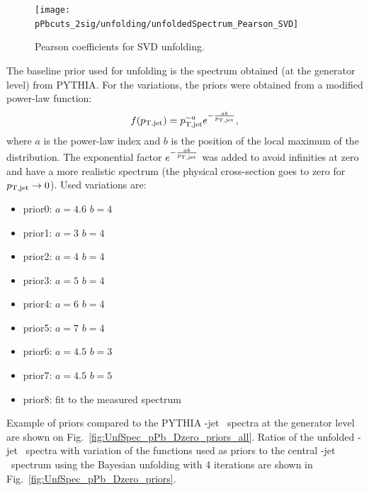 \begin{figure}[bth]
\centering
\texttt{[image: pPbcuts\_2sig/unfolding/unfoldedSpectrum\_Pearson\_SVD]}
\caption{Pearson coefficients for SVD unfolding.}
\label{fig:unfPearson_pPb_Dzero_SVD}
\end{figure}


The baseline prior used for unfolding is the spectrum obtained (at the generator level) from PYTHIA.
For the variations, the priors were obtained from a modified power-law function:
\begin{equation}
f(p_{\mathrm{T,jet}}) = p_{\mathrm{T,jet}}^{-a}e^{-\frac{ab}{p_{\mathrm{T,jet}}}},
\end{equation}
where $a$ is the power-law index and $b$ is the position of the local maximum of the distribution. The exponential factor $e^{-\frac{ab}{p_{\mathrm{T,jet}}}}$ was added to avoid infinities at zero and have a more realistic spectrum (the physical cross-section goes to zero for $p_{\mathrm{T,jet}} \to 0$).
Used variations are: 
\begin{itemize}
\item prior0: $a=4.6$ $b=4$~\GeVc\ 
\item prior1: $a=3$ $b=4$~\GeVc\
\item prior2: $a=4$ $b=4$~\GeVc\
\item prior3: $a=5$ $b=4$~\GeVc\
\item prior4: $a=6$ $b=4$~\GeVc\
\item prior5: $a=7$ $b=4$~\GeVc\
\item prior6: $a=4.5$ $b=3$~\GeVc\
\item prior7: $a=4.5$ $b=5$~\GeVc\
\item prior8: fit to the measured spectrum
\end{itemize}


Example of priors compared to the PYTHIA \Dzero-jet \pt\ spectra at the generator level are shown on Fig.~\ref{fig:UnfSpec_pPb_Dzero_priors_all}.
Ratios of the unfolded \Dzero-jet \pt\ spectra with variation of the functions used as priors to the central \Dzero-jet \pt\ spectrum using the Bayesian unfolding with 4 iterations are shown in Fig.~\ref{fig:UnfSpec_pPb_Dzero_priors}. 

